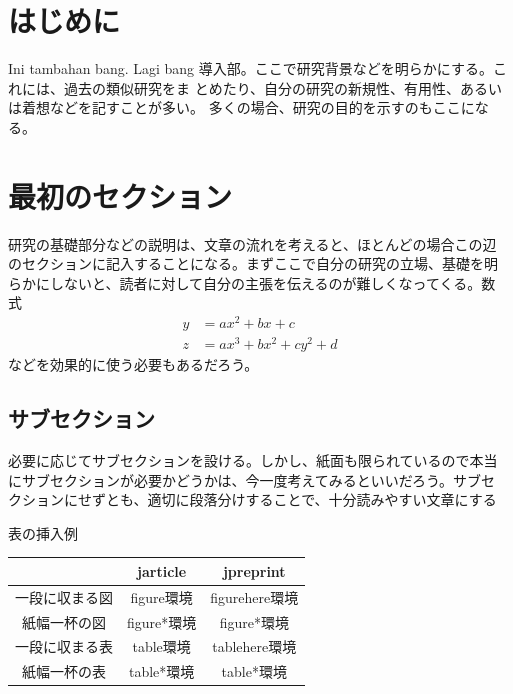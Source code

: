 \documentclass[dvipdfmx,uplatex,11pt]{jabstract}
\begin{document}
\maketitle

\begin{multicols}{2}
  
\section{はじめに}
Ini tambahan bang. Lagi bang
導入部。ここで研究背景などを明らかにする。これには、過去の類似研究をま
とめたり、自分の研究の新規性、有用性、あるいは着想などを記すことが多い。
多くの場合、研究の目的を示すのもここになる。

\section{最初のセクション}
研究の基礎部分などの説明は、文章の流れを考えると、ほとんどの場合この辺
のセクションに記入することになる。まずここで自分の研究の立場、基礎を明
らかにしないと、読者に対して自分の主張を伝えるのが難しくなってくる。数
式
\begin{align*}
  y &= ax^2 + bx + c\\
  z &= ax^3 + bx^2 + cy^2 + d
\end{align*}
などを効果的に使う必要もあるだろう。

\subsection{サブセクション}
必要に応じてサブセクションを設ける。しかし、紙面も限られているので本当
にサブセクションが必要かどうかは、今一度考えてみるといいだろう。サブセ
クションにせずとも、適切に段落分けすることで、十分読みやすい文章にする


\begin{tablehere}
  \caption{表の挿入例}
  \label{tab:sample}
  \begin{tabular}{|c|c|c|}
    \hline
    & jarticle & jpreprint\\
    \hline
    一段に収まる図 & figure環境 & figurehere環境\\
    \hline
    紙幅一杯の図 & figure*環境 & figure*環境\\
    \hline
    一段に収まる表 & table環境 & tablehere環境\\
    \hline
    紙幅一杯の表 & table*環境 & table*環境\\
    \hline
  \end{tabular}
\end{tablehere}


\end{multicols}
\end{document}
